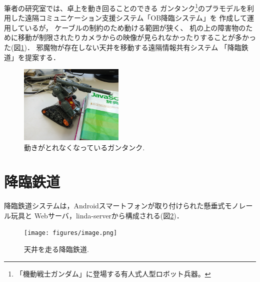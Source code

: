\documentclass[submit,techreq]{ipsj}
\begin{document}
筆者の研究室では、卓上を動き回ることのできる
ガンタンク\footnote{
  「機動戦士ガンダム」に登場する有人式人型ロボット兵器。
}のプラモデルを利用した遠隔コミュニケーション支援システム「OB降臨システム」を
作成して運用しているが\cite{Hirota:Korin}，
ケーブルの制約のため動ける範囲が狭く、
机の上の障害物のために移動が制限されたりカメラからの映像が見られなかったりすることが多かった(図\ref{guntank})．
%
邪魔物が存在しない天井を移動する遠隔情報共有システム
「降臨鉄道」を提案する．

\begin{figure}[H]
\centerline{\includegraphics[width=50mm]{figures/1e8781bb2a5b28c8e06906d226c7505a.png}}
\caption{動きがとれなくなっているガンタンク.}
\label{guntank}
\end{figure}



% 
% 
% 

\section{降臨鉄道}

降臨鉄道システムは，Androidスマートフォンが取り付けられた懸垂式モノレール玩具と
Webサーバ，linda-server\cite{Shokai:Linda}から構成される(図\ref{monorail})．

\begin{figure}[H]
\begin{center}
\texttt{[image: figures/image.png]}
\end{center}
\caption{天井を走る降臨鉄道.}
\label{monorail}
\end{figure}
\end{document}
